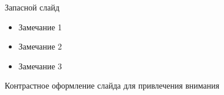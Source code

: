 \begin{frame}{Запасной слайд}
  \begin{itemize}
    \item Замечание 1
    \item Замечание 2
    \item Замечание 3
  \end{itemize}
\end{frame}

\begin{frame}[standout]
  Контрастное оформление слайда для привлечения внимания
\end{frame}